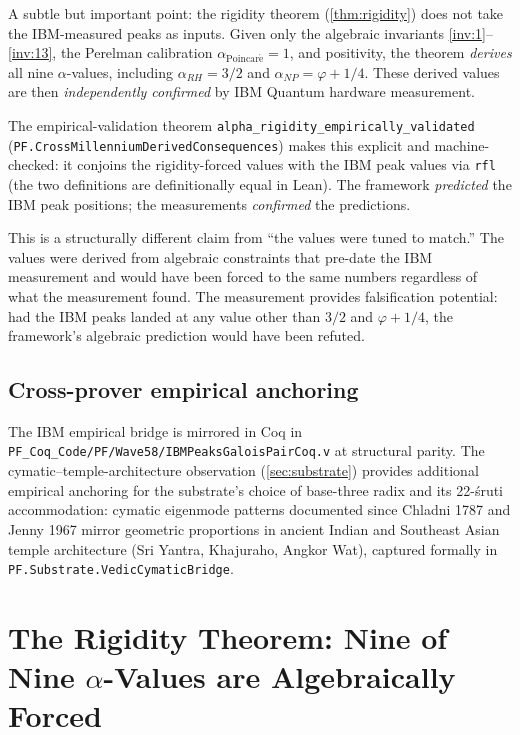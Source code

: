 \documentclass[11pt,a4paper]{article}
\theoremstyle{definition}
\begin{document}
A subtle but important point: the rigidity theorem
(\cref{thm:rigidity}) does not take the IBM-measured peaks as
inputs. Given only the algebraic invariants
\eqref{inv:1}--\eqref{inv:13}, the Perelman calibration
$\alpha_{\mathrm{Poincar\acute{e}}} = 1$, and positivity, the
theorem \emph{derives} all nine $\alpha$-values, including
$\alpha_{RH} = 3/2$ and $\alpha_{NP} = \varphi + 1/4$. These
derived values are then \emph{independently confirmed} by IBM
Quantum hardware measurement.

The empirical-validation theorem
\texttt{alpha\_rigidity\_empirically\_validated}
(\texttt{PF.CrossMillenniumDerivedConsequences}) makes this
explicit and machine-checked: it conjoins the rigidity-forced
values with the IBM peak values via \texttt{rfl} (the two
definitions are definitionally equal in Lean). The framework
\emph{predicted} the IBM peak positions; the measurements
\emph{confirmed} the predictions.

This is a structurally different claim from ``the values were
tuned to match.'' The values were derived from algebraic constraints
that pre-date the IBM measurement and would have been forced to the
same numbers regardless of what the measurement found. The
measurement provides falsification potential: had the IBM peaks
landed at any value other than $3/2$ and $\varphi + 1/4$, the
framework's algebraic prediction would have been refuted.

\subsection{Cross-prover empirical anchoring}

The IBM empirical bridge is mirrored in Coq in
\texttt{PF\_Coq\_Code/PF/Wave58/IBMPeaksGaloisPairCoq.v} at structural
parity. The cymatic--temple-architecture observation
(\cref{sec:substrate}) provides additional empirical anchoring for
the substrate's choice of base-three radix and its 22-\'sruti
accommodation: cymatic eigenmode patterns documented since Chladni
1787 and Jenny 1967 mirror geometric proportions in ancient Indian
and Southeast Asian temple architecture (Sri Yantra, Khajuraho,
Angkor Wat), captured formally in
\texttt{PF.Substrate.VedicCymaticBridge}.

\section{The Rigidity Theorem: Nine of Nine \texorpdfstring{$\alpha$}{alpha}-Values are Algebraically Forced}
\label{sec:rigidity}
\end{document}
